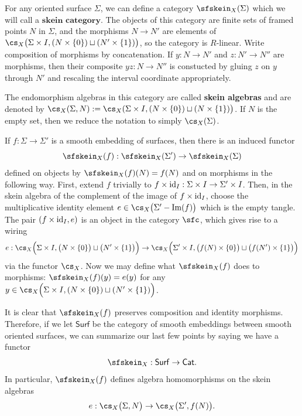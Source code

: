 For any oriented surface $\Sigma$, we can define a category $\sfskein_X(\Sigma)$ which we will call a $\textbf{skein category}$. The objects of this category are finite sets of framed points $N$ in $\Sigma$, and the morphisms $N \to N'$ are elements of $\cs_X\big(\Sigma \times I, (N \times \{0\}) \sqcup (N' \times \{1\})\big)$, so the category is $R$-linear. Write composition of morphisms by concatenation. If $y:N \to N'$ and $z:N' \to N''$ are morphisms, then their composite $yz:N \to N''$ is constucted by gluing $z$ on $y$ through $N'$ and rescaling the interval coordinate appropriately.


The endomorphism algebras in this category are called \textbf{skein algebras} and are denoted by $\cs_X(\Sigma, N) := \cs_X(\Sigma \times I, (N \times \{0\}) \sqcup (N \times \{1\}) \big)$. If $N$ is the empty set, then we reduce the notation to simply $\cs_X(\Sigma)$.

If $f: \Sigma \to \Sigma'$ is a smooth embedding of surfaces, then there is an induced functor 
\[
\sfskein_X(f): \sfskein_X(\Sigma') \to \sfskein_X(\Sigma)
\]
defined on objects by $\sfskein_X(f)(N) = f(N)$ and on morphisms in the following way. First, extend $f$ trivially to $f \times {\rm{id}}_I: \Sigma \times I \to \Sigma' \times I$. Then, in the skein algebra of the complement of the image of $f \times {\rm{id}}_I$, choose the multiplicative identity element $e \in \cs_X\big( \Sigma' - \im(f) \big)$ which is the empty tangle. The pair $(f \times {\rm{id}}_I, e)$ is an object in the category $\sfc$, which gives rise to a wiring
\[e: \cs_X\Big(\Sigma \times I, \big(N \times \{0\}\big) \sqcup \big(N' \times \{1\}\big) \Big) \to \cs_X\Big(\Sigma' \times I, \big(f(N) \times \{0\}\big) \sqcup \big( f(N') \times \{1\} \big) \Big)\]
via the functor $\cs_X$. Now we may define what $\sfskein_X(f)$ does to morphisms: $\sfskein_X(f)(y) = e(y)$ for any $y \in \cs_X\Big(\Sigma \times I, (N \times \{0\}) \sqcup (N' \times \{1\}) \Big)$.


It is clear that $\sfskein_X(f)$ preserves composition and identity morphisms. Therefore, if we let $\mathsf{Surf}$ be the category of smooth embeddings between smooth oriented surfaces, we can summarize our last few points by saying we have a functor
\[
\sfskein_X: \mathsf{Surf} \to \mathsf{Cat}.
\]
In particular, $\sfskein_X(f)$ defines algebra homomorphisms on the skein algebras
\[e: \cs_X\big(\Sigma, N\big) \to \cs_X\big(\Sigma', f(N)\big).\]

